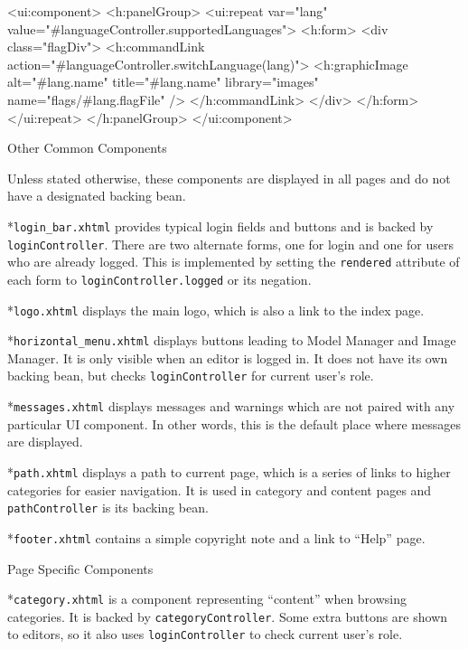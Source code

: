 \begtt

<ui:component>
  <h:panelGroup>
    <ui:repeat var="lang"
        value="#{languageController.supportedLanguages}">                    
      <h:form>
        <div class="flagDiv">
          <h:commandLink
              action="#{languageController.switchLanguage(lang)}">
            <h:graphicImage
                alt="#{lang.name}" title="#{lang.name}"
                library="images" name="flags/#{lang.flagFile}" />
          </h:commandLink>
        </div>
      </h:form>
    </ui:repeat>
  </h:panelGroup>
</ui:component>

\endtt

\secc Other Common Components

Unless stated otherwise, these components are displayed in all pages and do not have a designated backing bean.

\begitems

*{\tt login\_bar.xhtml} provides typical login fields and buttons and is backed by {\tt loginController}. There are two alternate forms, one for login and one for users who are already logged. This is implemented by setting the {\tt rendered} attribute of each form to {\tt loginController.logged} or its negation.

*{\tt logo.xhtml} displays the main logo, which is also a link to the index page.

*{\tt horizontal\_menu.xhtml} displays buttons leading to Model Manager and Image Manager. It is only visible when an editor is logged in. It does not have its own backing bean, but checks {\tt loginController} for current user’s role.

*{\tt messages.xhtml} displays messages and warnings which are not paired with any particular UI component. In other words, this is the default place where messages are displayed.

*{\tt path.xhtml} displays a path to current page, which is a series of links to higher categories for easier navigation. It is used in category and content pages and {\tt pathController} is its backing bean.

*{\tt footer.xhtml} contains a simple copyright note and a link to “Help” page.

\enditems

\secc Page Specific Components

\begitems

*{\tt category.xhtml} is a component representing “content” when browsing categories. It is backed by {\tt categoryController}. Some extra buttons are shown to editors, so it also uses {\tt loginController} to check current user’s role.

